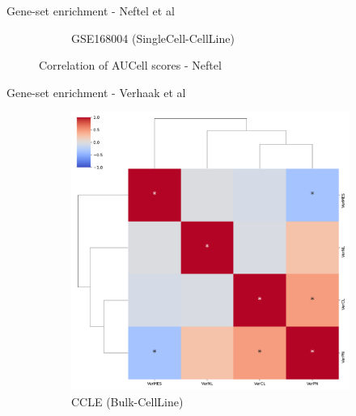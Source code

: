 \documentclass[aspectratio=169,9pt]{beamer}
\begin{document}
\begin{frame}{Gene-set enrichment - Neftel et al}
\begin{adjustwidth}{-5cm}{-5cm}
\begin{figure}
\begin{subfigure}[c]{0.48\textwidth}
                    \caption{GSE168004 (SingleCell-CellLine)}
                \end{subfigure}
                \caption{Correlation of AUCell scores - Neftel}
            \end{figure}
        \end{adjustwidth}
    \end{frame}

    \begin{frame}{Gene-set enrichment - Verhaak et al}
        \begin{adjustwidth}{-5cm}{-5cm}
            \centering
            \begin{figure}\ContinuedFloat
                \centering
                \begin{subfigure}[c]{0.48\textwidth}
                    \centering
                    \includegraphics[width=\textwidth]{ssGSEA_CCLE_corrplot_Ver}
                    \caption{CCLE (Bulk-CellLine)}
                \end{subfigure}
                \begin{subfigure}[c]{0.48\textwidth}
                    \centering

\end{subfigure}
\end{figure}
\end{adjustwidth}
\end{frame}
\end{document}

